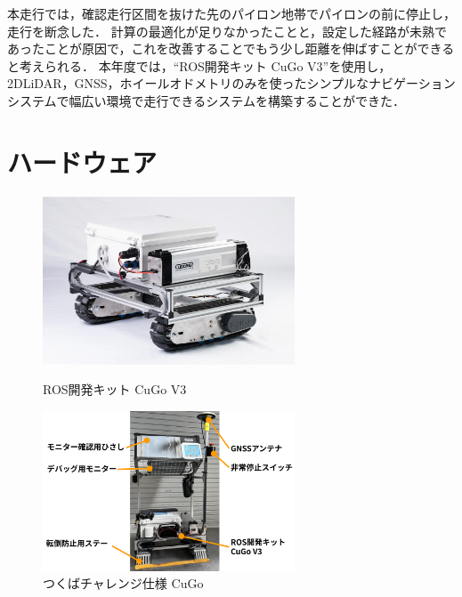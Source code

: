\documentclass[platex,dvipdfmx]{rbproceedings}
\begin{document}
本走行では，確認走行区間を抜けた先のパイロン地帯でパイロンの前に停止し，走行を断念した．
計算の最適化が足りなかったことと，設定した経路が未熟であったことが原因で，これを改善することでもう少し距離を伸ばすことができると考えられる．
本年度では，“ROS開発キット CuGo V3”を使用し，2DLiDAR，GNSS，ホイールオドメトリのみを使ったシンプルなナビゲーションシステムで幅広い環境で走行できるシステムを構築することができた．

\section{ハードウェア}

\begin{figure}[bth]
   \centering
   \begin{minipage}[b]{.45\linewidth}
       \centering   
       \includegraphics[keepaspectratio,width=75mm]{fig/cugo_ros.jpg}
       \caption{ROS開発キット CuGo V3}
       \label{fig:cugo_ros}
   \end{minipage}
   \begin{minipage}[b]{.45\linewidth}
       \centering
       \includegraphics[keepaspectratio,width=75mm]{fig/cugo_tsukuba.png}
       \caption{つくばチャレンジ仕様 CuGo}
       \label{fig:cugo_ros_tsukuba}
   \end{minipage}
\end{figure}
\end{document}
